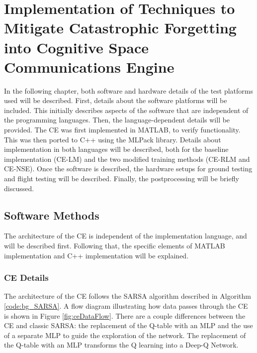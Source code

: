 \chapter{Implementation of Techniques to Mitigate Catastrophic Forgetting into Cognitive Space Communications Engine}\label{ch:methods}
\par In the following chapter, both software and hardware details of the test platforms used will be described. First, details about the software platforms will be included. This initially describes aspects of the software that are independent of the programming languages. Then, the language-dependent details will be provided. The CE was first implemented in MATLAB, to verify functionality. This was then ported to C++ using the MLPack library. Details about implementation in both languages will be described, both for the baseline implementation (CE-LM) and the two modified training methods (CE-RLM and CE-NSE). Once the software is described, the hardware setups for ground testing and flight testing will be described. Finally, the postprocessing will be briefly discussed.

\section{Software Methods}
\par The architecture of the CE is independent of the implementation language, and will be described first. Following that, the specific elements of MATLAB implementation and C++ implementation will be explained.
\subsection{CE Details}
\par The architecture of the CE follows the SARSA algorithm described in Algorithm \ref{code:bg_SARSA}. A flow diagram illustrating how data passes through the CE is shown in Figure \ref{fig:ceDataFlow}. There are a couple differences between the CE and classic SARSA: the replacement of the Q-table with an MLP and the use of a separate MLP to guide the exploration of the network. The replacement of the Q-table with an MLP transforms the Q learning into a Deep-Q Network.

